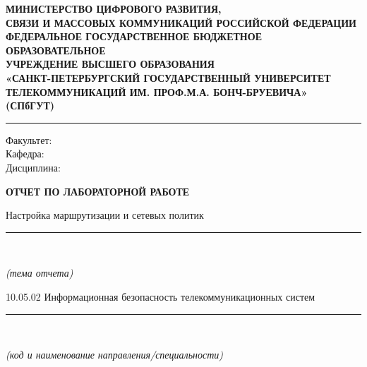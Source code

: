 \documentclass[14pt]{extreport}
\begin{document}
\begin{titlepage}
  \begin{center}
    \onehalfspacing
    \begin{small}
      \singlespacing
      \textbf{МИНИСТЕРСТВО ЦИФРОВОГО РАЗВИТИЯ,\\
      СВЯЗИ И МАССОВЫХ КОММУНИКАЦИЙ РОССИЙСКОЙ ФЕДЕРАЦИИ}\\
      \bigskip
      \textbf{ФЕДЕРАЛЬНОЕ ГОСУДАРСТВЕННОЕ БЮДЖЕТНОЕ ОБРАЗОВАТЕЛЬНОЕ\\
      УЧРЕЖДЕНИЕ ВЫСШЕГО ОБРАЗОВАНИЯ\\
      «САНКТ-ПЕТЕРБУРГСКИЙ ГОСУДАРСТВЕННЫЙ УНИВЕРСИТЕТ\\
      ТЕЛЕКОММУНИКАЦИЙ ИМ. ПРОФ.М.А. БОНЧ-БРУЕВИЧА»\\
      (СПбГУТ)}
    \end{small}

    \textcolor[RGB]{160,160,160}{\rule{\textwidth}{0.5pt}}

    Факультет: \underline{}\\
    Кафедра: \underline{}\\
    Дисциплина: \underline{}\\

    \vspace{3em}

    \textbf{ОТЧЕТ ПО ЛАБОРАТОРНОЙ РАБОТЕ}

    \vspace{4em}

     Настройка маршрутизации и сетевых политик\\
     \vspace{-3ex}
     \rule{\textwidth}{0.5pt}\\
     \vspace{-2ex}
     \begin{footnotesize}
       \textit{(тема отчета)}
     \end{footnotesize}

    \vspace{1em}


     10.05.02 Информационная безопасность телекоммуникационных систем\\
     \vspace{-3ex}
     \rule{\textwidth}{0.5pt}\\
     \vspace{-2ex}
     \begin{footnotesize}
        \textit{(код и наименование направления/специальности)}
     \end{footnotesize}


\end{center}
\end{titlepage}
\end{document}
